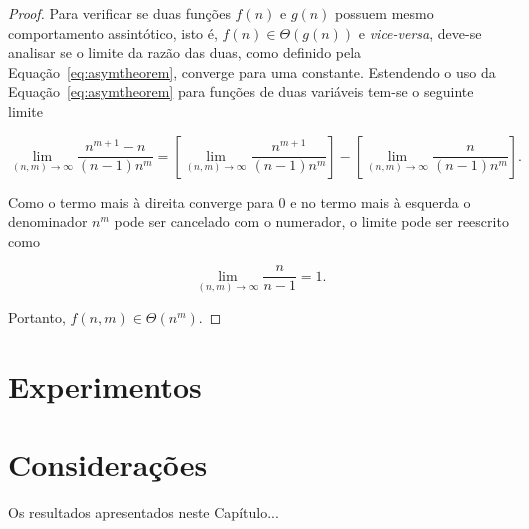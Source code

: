 \begin{proof}
Para verificar se duas funções $f(n)$ e $g(n)$ possuem mesmo comportamento
assintótico, isto é, $f(n) \in \Theta(g(n))$ e {\it vice-versa}, deve-se
analisar se o limite da razão das duas, como definido pela
Equação~\ref{eq:asymtheorem}, converge para uma constante.
Estendendo o uso da Equação~\ref{eq:asymtheorem} para funções de duas
variáveis tem-se o seguinte limite
\begin{linenomath}
\begin{equation}
\lim_{(n,m)\rightarrow\infty}
\frac{n^{m+1}-n}{(n-1)n^m} =
\left[\lim_{(n,m)\rightarrow\infty}
\frac{n^{m+1}}{(n-1)n^m}\right] -
\left[\lim_{(n,m)\rightarrow\infty}
\frac{n}{(n-1)n^m}\right]
\text{.}
\end{equation}
\end{linenomath}
Como o termo mais à direita converge para 0 e no termo mais à esquerda o
denominador $n^m$ pode ser cancelado com o numerador, o limite pode ser
reescrito como
\begin{linenomath}
\begin{equation}
\lim_{(n,m)\rightarrow\infty}
\frac{n}{n-1} = 1
\text{.}
\end{equation}
\end{linenomath}
Portanto, $f(n,m) \in \Theta(n^m)$.
\end{proof}

\section{Experimentos}
\label{sec:3:experimentos}


\section{Considerações}
\label{sec:3:consideracoes}

Os resultados apresentados neste Capítulo...


